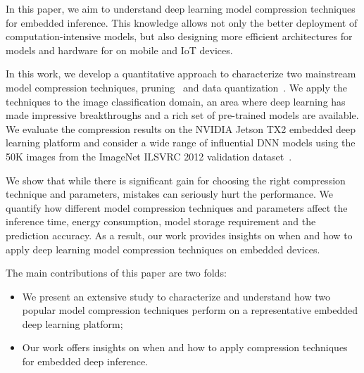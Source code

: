 In this paper, we aim to understand deep learning model compression techniques for embedded inference. This knowledge allows not only the
better deployment of computation-intensive models, but also designing more efficient architectures for models and hardware for on mobile
and IoT devices.

In this work, we develop a quantitative approach  to characterize two mainstream model compression techniques, pruning~\cite{Li2016Pruning} and data
quantization~\cite{Gong2014Compressing}. We apply the techniques to the image classification domain, an area where deep learning has made impressive
breakthroughs and a rich set of pre-trained models are available. We evaluate the compression results on the NVIDIA Jetson TX2 embedded
deep learning platform and consider a wide range of influential DNN models using the 50K images from the ImageNet ILSVRC 2012 validation
dataset~\cite{imagenet2012}.

We show that while there is significant gain for choosing the right compression technique and parameters, mistakes can seriously hurt the
performance. We quantify how different model compression techniques and parameters affect the inference time, energy consumption, model
storage requirement and the prediction accuracy. As a result, our work provides insights on when and how to apply deep learning model
compression techniques on embedded devices.

The main contributions of this paper are two folds:

\begin{itemize}
\item We present an extensive study to characterize and understand how two popular model compression techniques perform on a
    representative embedded deep learning platform;
\item Our work offers insights on when and how to apply compression techniques for embedded deep inference.
\end{itemize}